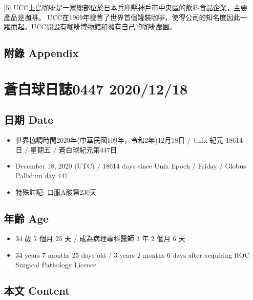 \documentclass[
]{article}
\providecommand{\tightlist}{%
  \setlength{\itemsep}{0pt}\setlength{\parskip}{0pt}}
\begin{document}
{[}5{]}
UCC上島咖啡是一家總部位於日本兵庫縣神戶市中央區的飲料食品企業，主要產品是咖啡。
UCC在1969年發售了世界首個罐裝咖啡，使得公司的知名度因此一躍而起。UCC開設有咖啡博物館和擁有自己的咖啡農園。

\hypertarget{ux9644ux9304-appendix-16}{%
\subsection{附錄 Appendix}\label{ux9644ux9304-appendix-16}}

\hypertarget{ux84bcux767dux7403ux65e5ux8a8c0447-20201218}{%
\section{蒼白球日誌0447
2020/12/18}\label{ux84bcux767dux7403ux65e5ux8a8c0447-20201218}}

\hypertarget{ux65e5ux671f-date-17}{%
\subsection{日期 Date}\label{ux65e5ux671f-date-17}}

\begin{itemize}
\tightlist
\item
  世界協調時間2020年(中華民國109年，令和2年)12月18日 / Unix 紀元 18614
  日 / 星期五 / 蒼白球紀元第447日
\item
  December 18, 2020 (UTC) / 18614 days since Unix Epoch / Friday /
  Globus Pallidum day 447
\item
  特殊註記: 口服A酸第230天
\end{itemize}

\hypertarget{ux5e74ux9f61-age-17}{%
\subsection{年齡 Age}\label{ux5e74ux9f61-age-17}}

\begin{itemize}
\tightlist
\item
  34 歲 7 個月 25 天 / 成為病理專科醫師 3 年 2 個月 6 天
\item
  34 years 7 months 25 days old / 3 years 2 months 6 days after
  acquiring ROC Surgical Pathology Licence
\end{itemize}

\hypertarget{ux672cux6587-content-17}{%
\subsection{本文 Content}\label{ux672cux6587-content-17}}
\end{document}
